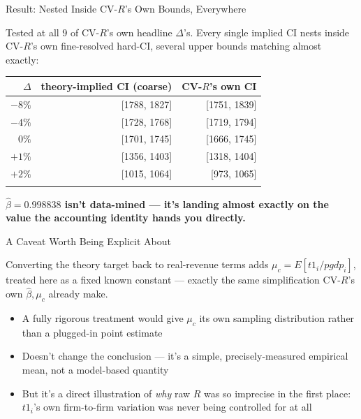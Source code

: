 \documentclass[
  ignorenonframetext,
  aspectratio=169,
]{beamer}
\newcounter{none} %
\providecommand{\tightlist}{%
  \setlength{\itemsep}{0pt}\setlength{\parskip}{0pt}}
\begin{document}
\begin{frame}{Result: Nested Inside CV-\(R\)'s Own Bounds, Everywhere}
\protect{}\label{result-nested-inside-cv-rs-own-bounds-everywhere}
\footnotesize

Tested at all 9 of CV-\(R\)'s own headline \(\Delta\)'s. Every single
implied CI nests inside CV-\(R\)'s own fine-resolved hard-CI, several
upper bounds matching almost exactly:

{\def\LTcaptype{none} %
\begin{longtable}[]{@{}rrr@{}}
\toprule\noalign{}
\(\Delta\) & theory-implied CI (coarse) & CV-\(R\)'s own CI \\
\midrule\noalign{}
\endhead
\(-8\%\) & {[}1788, 1827{]} & {[}1751, 1839{]} \\
\(-4\%\) & {[}1728, 1768{]} & {[}1719, 1794{]} \\
\(0\%\) & {[}1701, 1745{]} & {[}1666, 1745{]} \\
\(+1\%\) & {[}1356, 1403{]} & {[}1318, 1404{]} \\
\(+2\%\) & {[}1015, 1064{]} & {[}973, 1065{]} \\
\bottomrule\noalign{}
\end{longtable}
}

\textbf{\(\hat\beta=0.998838\) isn't data-mined --- it's landing almost
exactly on the value the accounting identity hands you directly.}
\end{frame}

\begin{frame}{A Caveat Worth Being Explicit About}
\protect{}\label{a-caveat-worth-being-explicit-about}
\footnotesize

Converting the theory target back to real-revenue terms adds
\(\mu_c=E[t1_i/pgdp_i]\), treated here as a fixed known constant ---
exactly the same simplification CV-\(R\)'s own \(\hat\beta,\mu_c\)
already make.

\begin{itemize}
\tightlist
\item
  A fully rigorous treatment would give \(\mu_c\) its own sampling
  distribution rather than a plugged-in point estimate
\item
  Doesn't change the conclusion --- it's a simple, precisely-measured
  empirical mean, not a model-based quantity
\item
  But it's a direct illustration of \emph{why} raw \(R\) was so
  imprecise in the first place: \(t1_i\)'s own firm-to-firm variation
  was never being controlled for at all
\end{itemize}
\end{frame}
\end{document}

